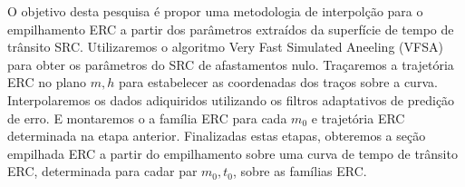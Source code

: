O objetivo desta pesquisa é propor uma metodologia de interpolção para o empilhamento ERC 
a partir dos parâmetros extraídos da superfície de tempo de trânsito SRC. Utilizaremos o 
algoritmo Very Fast Simulated Aneeling (VFSA) para obter os parâmetros do SRC de afastamentos nulo.
Traçaremos a trajetória ERC no plano $m, h$ para estabelecer as coordenadas dos traços sobre a curva.
Interpolaremos os dados adiquiridos utilizando os filtros adaptativos de predição de erro. E montaremos
o a família ERC para cada $m_0$ e trajetória ERC determinada na etapa anterior. Finalizadas estas etapas,
obteremos a seção empilhada ERC a partir do empilhamento sobre uma curva de tempo de trânsito ERC, determinada
para cadar par $m_0, t_0$, sobre as famílias ERC.
